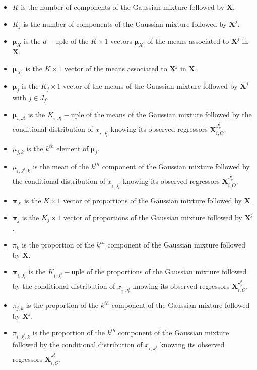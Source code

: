 \documentclass[12pt,a4paper]{report}
\begin{document}
\begin{itemize}
	\item $K$ is the number of components of the Gaussian mixture followed by $\boldsymbol{X}$.
	\item $K_j$ is the number of components of the Gaussian mixture followed by $\boldsymbol{X}^j$.
	\item $\boldsymbol{\mu}_X$ is the $d-$uple of the $K \times 1$ vectors $\boldsymbol{\mu}_{X^j}$ of the means associated to $\boldsymbol{X}^j$ in $\boldsymbol{X}$.
	\item $\boldsymbol{\mu}_{X^j}$ is the $K \times 1$ vector of the means associated to $\boldsymbol{X}^j$ in $\boldsymbol{X}$.
	\item $\boldsymbol{\mu}_j$ is the $K_j \times 1$ vector of the means of the Gaussian mixture followed by $\boldsymbol{X}^j$ with $j\in J_f$.
	\item $\boldsymbol{\mu}_{i,J_r^j}$ is the $K_{i,J_r^j}-$uple of the means of the Gaussian mixture followed by the conditional distribution of $x_{i,J_r^j}$ knowing its observed regressors $\boldsymbol{X}_{i,O}^{J_p^j}$.	
	\item $\mu_{j,k}$ is the $k^{th}$ element of $\boldsymbol{\mu}_j$.
	\item $\mu_{i,J_r^j,k}$ is the mean of the $k^{th}$ component of the Gaussian mixture followed by the conditional distribution of $x_{i,J_r^j}$ knowing its observed regressors $\boldsymbol{X}_{i,O}^{J_p^j}$.
	\item $\boldsymbol{\pi}_X$ is the $K \times 1 $ vector of proportions of the Gaussian mixture followed by $\boldsymbol{X}$.
	\item $\boldsymbol{\pi}_j$ is the $K_j \times 1 $ vector of proportions of the Gaussian mixture followed by $\boldsymbol{X}^j$.
	\item $\pi_k$ is the proportion of the $k^{th}$ component of the Gaussian mixture followed by $\boldsymbol{X}$.
	\item $\boldsymbol{\pi}_{i,J_r^j}$ is the $K_{i,J_r^j}-$uple of the proportions of the Gaussian mixture followed by the conditional distribution of $x_{i,J_r^j}$ knowing its observed regressors $\boldsymbol{X}_{i,O}^{J_p^j}$.
	\item $\pi_{j,k}$ is the proportion of the $k^{th}$ component of the Gaussian mixture followed by $\boldsymbol{X}^j$.
	\item $\pi_{i,J_r^j,k}$ is the proportion of the $k^{th}$ component of the Gaussian mixture followed by the conditional distribution of $x_{i,J_r^j}$ knowing its observed regressors $\boldsymbol{X}_{i,O}^{J_p^j}$.

\end{itemize}
\end{document}
